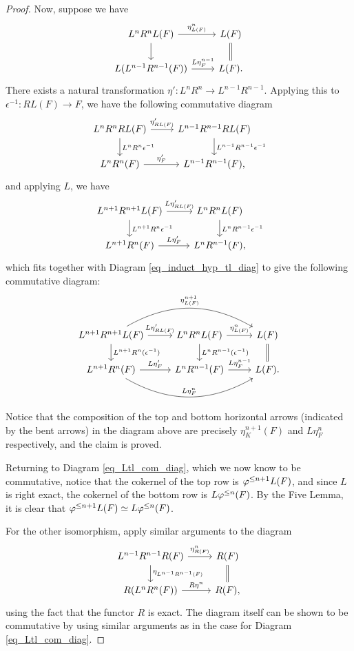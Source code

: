 \begin{proof}
Now, suppose we have
\begin{equation}\label{eq_induct_hyp_tl_diag}
\begin{tikzcd}
L^{n}R^{n}L(F) \arrow{r}{\eta^{n}_{L(F)}} \arrow{d} &
L(F) \arrow[equals]{d} \\
L(L^{n - 1}R^{n - 1}(F)) \arrow{r}{L\eta^{n - 1}_F} &
L(F).
\end{tikzcd}
\end{equation}
There exists a natural transformation $\eta': L^n R^n \to 
L^{n - 1} R^{n - 1}$. Applying this to $\epsilon^{-1}: RL(F) \to 
F$, we have the following commutative diagram
\[
\begin{tikzcd}
L^n R^n RL(F) \arrow{r}{\eta'_{RL(F)}} 
   \arrow{d}{L^nR^n \epsilon^{-1}} &
L^{n - 1}R^{n - 1} RL(F) 
   \arrow{d}{L^{n - 1}R^{n - 1}\epsilon^{-1}} \\
L^nR^n(F) \arrow{r}{\eta'_F} &
L^{n - 1}R^{n - 1} (F),
\end{tikzcd}
\]
and applying $L$, we have
\[
\begin{tikzcd}
L^{n + 1} R^{n + 1} L(F) \arrow{r}{L\eta'_{RL(F)}} 
   \arrow{d}{L^{n + 1}R^n \epsilon^{-1}} &
L^{n}R^n L(F) \arrow{d}{L^nR^{n - 1}\epsilon^{-1}} \\
L^{n + 1}R^n(F) \arrow{r}{L\eta'_F} &
L^{n}R^{n - 1}(F),
\end{tikzcd}
\]
which fits together with Diagram \ref{eq_induct_hyp_tl_diag} to 
give the following commutative diagram:
\[
\begin{tikzcd}
L^{n + 1} R^{n + 1} L(F) \arrow{r}{L\eta'_{RL(F)}} 
   \arrow{d}{L^{n + 1}R^n(\epsilon^{-1})}
   \arrow[bend left]{rr}{\eta^{n + 1}_{L(F)}} &
L^{n}R^n L(F) \arrow{d}{L^nR^{n - 1}(\epsilon^{-1})}
   \arrow{r}{\eta^{n}_{L(F)}} &
L(F) \arrow[equals]{d} \\
L^{n + 1}R^n(F) \arrow{r}{L\eta'_F} 
   \arrow[bend right]{rr}{L\eta^n_F} &
L^{n}R^{n - 1}(F) \arrow{r}{L\eta^{n - 1}_F} &
L(F).
\end{tikzcd}
\]
Notice that the composition of the top and bottom horizontal 
arrows (indicated by the bent arrows) in the diagram above are 
precisely $\eta^{n + 1}_K(F)$ and $L \eta^n_F$ respectively, and
the claim is proved.

Returning to Diagram \ref{eq_Ltl_com_diag}, which we now know to 
be commutative, notice that the cokernel of the top row is 
$\varphi^{\leq n + 1}L(F)$, and since $L$ is right exact, the cokernel of 
the bottom row is $L\varphi^{\leq n}(F)$. By the Five Lemma, it is clear 
that $\varphi^{\leq n + 1}L(F) \simeq L\varphi^{\leq n}(F)$.

For the other isomorphism, apply similar arguments to the
diagram
\[
\begin{tikzcd}
L^{n - 1}R^{n - 1}R(F) \arrow{r}{\eta^n_{R(F)}} 
   \arrow{d}{\eta_{L^{n - 1}R^{n - 1}(F)}} &
R(F) \arrow[equals]{d} \\
R (L^n R^n(F)) \arrow{r}{R \eta^n} &
R(F),
\end{tikzcd}
\]
using the fact that the functor $R$ is exact. The diagram itself
can be shown to be commutative by using similar arguments as in
the case for Diagram \ref{eq_Ltl_com_diag}.
\end{proof}

